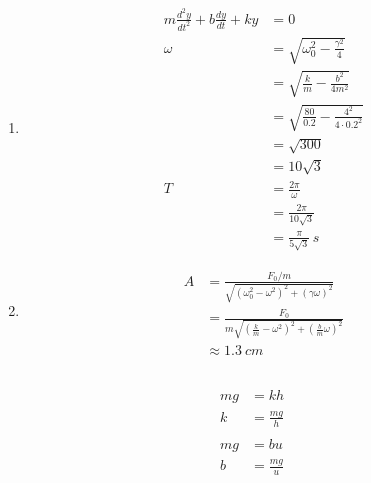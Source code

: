 \documentclass{article}
\begin{document}
\begin{enumerate}
  \item

        \begin{align*}
          m \frac{d^2 y}{d t^2} + b \frac{d y}{d t} + k y & = 0                                                 \\
          \omega                                          & = \sqrt{\omega_0^2 - \frac{\gamma^2}{4}}            \\
                                                          & = \sqrt{\frac{k}{m} - \frac{b^2}{4 m^2}}            \\
                                                          & = \sqrt{\frac{80}{0.2} - \frac{4^2}{4 \cdot 0.2^2}} \\
                                                          & = \sqrt{300}                                        \\
                                                          & = 10 \sqrt{3}                                       \\
          T                                               & = \frac{2 \pi}{\omega}                              \\
                                                          & = \frac{2 \pi}{10 \sqrt{3}}                         \\
                                                          & = \frac{\pi}{5 \sqrt{3}} \,\unit{s}
        \end{align*}

  \item

        \begin{align*}
          A & = \frac{F_0 / m}{\sqrt{(\omega_0^2 - \omega^2)^2 + (\gamma \omega)^2}}                               \\
            & = \frac{F_0}{m \sqrt{\left( \frac{k}{m} - \omega^2 \right)^2 + \left( \frac{b}{m} \omega \right)^2}} \\
            & \approx \qty{1.3}{cm}
        \end{align*}
\end{enumerate}

\subsection{}

\begin{align*}
  m g & = k h           \\
  k   & = \frac{m g}{h} \\ \\
  m g & = b u           \\
  b   & = \frac{m g}{u}
\end{align*}
\end{document}

